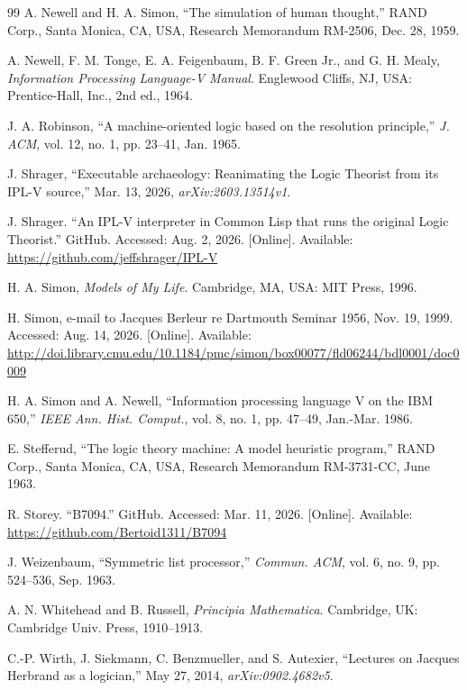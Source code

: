\documentclass{IEEEcsmag}
\begin{document}
\begin{thebibliography}{99}
 A. Newell and H. A. Simon,
  ``The simulation of human thought,''
  RAND Corp., Santa Monica, CA, USA,
  Research Memorandum RM-2506, Dec. 28, 1959.

 A. Newell, F. M. Tonge, E. A. Feigenbaum,
  B. F. Green Jr., and G. H. Mealy,
  \textit{Information
  Processing Language-V Manual}. Englewood Cliffs, NJ, USA:
  Prentice-Hall, Inc., 2nd ed., 1964.

 J. A. Robinson,
  ``A machine-oriented logic based on the resolution principle,''
  \textit{J. ACM}, vol. 12, no. 1, pp. 23--41, Jan. 1965.

 J. Shrager,
  ``Executable archaeology: Reanimating the Logic Theorist
  from its IPL-V source,''
  Mar. 13, 2026, \textit{arXiv:2603.13514v1}.

 J. Shrager.
  ``An IPL-V interpreter in Common Lisp that runs the original Logic
  Theorist.''
  GitHub.
  Accessed: Aug. 2, 2026.  [Online].
  Available: \url{https://github.com/jeffshrager/IPL-V}

 H. A. Simon, \textit{Models of My Life}.
  Cambridge, MA, USA: MIT Press, 1996.

 H. Simon, e-mail to Jacques Berleur
  re Dartmouth Seminar 1956, Nov. 19, 1999.
  Accessed: Aug. 14, 2026.  [Online].
  Available: \url{http://doi.library.cmu.edu/10.1184/pmc/simon/box00077/fld06244/bdl0001/doc0009}

 H. A. Simon and A. Newell,
  ``Information processing language V on the IBM 650,''
  \textit{IEEE Ann. Hist. Comput.}, vol. 8, no. 1, pp. 47--49, Jan.-Mar. 1986.

 E. Stefferud,
  ``The logic theory machine: A model heuristic program,''
  RAND Corp., Santa Monica, CA, USA, Research Memorandum RM-3731-CC, June 1963.

 R. Storey. ``B7094.''
  GitHub.
  Accessed: Mar. 11, 2026.  [Online].
  Available: \url{https://github.com/Bertoid1311/B7094}

 J. Weizenbaum, ``Symmetric list processor,''
  \textit{Commun. ACM}, vol. 6, no. 9, pp. 524--536, Sep. 1963.

 A. N. Whitehead and B. Russell,
  \textit{Principia Mathematica}. Cambridge, UK: Cambridge
  Univ. Press, 1910--1913.

 C.-P. Wirth, J. Siekmann,
  C. Benzmueller, and S. Autexier,
  ``Lectures on Jacques Herbrand as a logician,''
  May 27, 2014, \textit{arXiv:0902.4682v5}.

\end{thebibliography}
\end{document}
